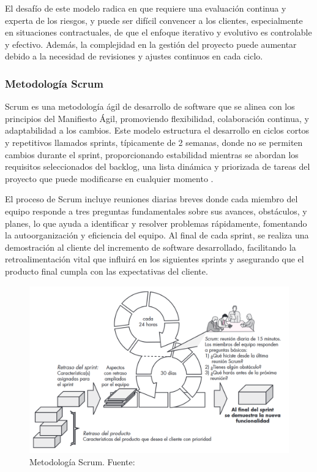 \documentclass[main.tex]{subfiles}
\begin{document}
El desafío de este modelo radica en que requiere una evaluación continua y experta de los riesgos, y puede ser difícil convencer a los clientes, especialmente en situaciones contractuales, de que el enfoque iterativo y evolutivo es controlable y efectivo. Además, la complejidad en la gestión del proyecto puede aumentar debido a la necesidad de revisiones y ajustes continuos en cada ciclo.

\subsubsection{Metodología Scrum}

Scrum es una metodología ágil de desarrollo de software que se alinea con los principios del Manifiesto Ágil, promoviendo flexibilidad, colaboración continua, y adaptabilidad a los cambios. Este modelo estructura el desarrollo en ciclos cortos y repetitivos llamados sprints, típicamente de 2 semanas, donde no se permiten cambios durante el sprint, proporcionando estabilidad mientras se abordan los requisitos seleccionados del backlog, una lista dinámica y priorizada de tareas del proyecto que puede modificarse en cualquier momento \cite{pressman2010ingeneria}.

El proceso de Scrum incluye reuniones diarias breves donde cada miembro del equipo responde a tres preguntas fundamentales sobre sus avances, obstáculos, y planes, lo que ayuda a identificar y resolver problemas rápidamente, fomentando la autoorganización y eficiencia del equipo. Al final de cada sprint, se realiza una demostración al cliente del incremento de software desarrollado, facilitando la retroalimentación vital que influirá en los siguientes sprints y asegurando que el producto final cumpla con las expectativas del cliente.

\begin{figure}[h]
	\centering
	\includegraphics[width=\linewidth]{../assets/model-scrum.png}
	\caption{Metodología Scrum. Fuente: \cite{pressman2010ingeneria}}
\end{figure}
\end{document}
